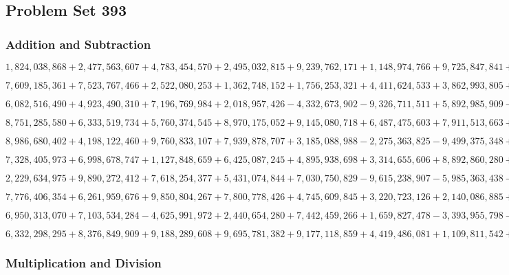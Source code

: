 \hypertarget{problem-set-393}{%
\subsection{Problem Set 393}\label{problem-set-393}}

\hypertarget{addition-and-subtraction}{%
\subsubsection{Addition and
Subtraction}\label{addition-and-subtraction}}

\(1,824,038,868+2,477,563,607+4,783,454,570+2,495,032,815+9,239,762,171+1,148,974,766+9,725,847,841+7,853,952,650+6,992,059,008+8,884,891,702\)

\(7,609,185,361+7,523,767,466+2,522,080,253+1,362,748,152+1,756,253,321+4,411,624,533+3,862,993,805+5,474,061,693+1,613,307,367+2,268,274,945\)

\(6,082,516,490+4,923,490,310+7,196,769,984+2,018,957,426-4,332,673,902-9,326,711,511+5,892,985,909-1,389,640,665-6,403,567,112+4,152,262,346\)

\(8,751,285,580+6,333,519,734+5,760,374,545+8,970,175,052+9,145,080,718+6,487,475,603+7,911,513,663+5,209,350,558+9,546,205,818+3,537,917,117\)

\(8,986,680,402+4,198,122,460+9,760,833,107+7,939,878,707+3,185,088,988-2,275,363,825-9,499,375,348+4,090,307,284-2,771,958,704-2,247,428,825\)

\(7,328,405,973+6,998,678,747+1,127,848,659+6,425,087,245+4,895,938,698+3,314,655,606+8,892,860,280+2,183,846,619+1,078,702,469+7,596,340,287\)

\(2,229,634,975+9,890,272,412+7,618,254,377+5,431,074,844+7,030,750,829-9,615,238,907-5,985,363,438-8,245,461,339+5,972,166,717-2,576,525,684\)

\(7,776,406,354+6,261,959,676+9,850,804,267+7,800,778,426+4,745,609,845+3,220,723,126+2,140,086,885+2,694,816,453+9,677,147,243+3,454,510,975\)

\(6,950,313,070+7,103,534,284-4,625,991,972+2,440,654,280+7,442,459,266+1,659,827,478-3,393,955,798-7,127,500,855-6,126,108,662+5,548,220,060\)

\(6,332,298,295+8,376,849,909+9,188,289,608+9,695,781,382+9,177,118,859+4,419,486,081+1,109,811,542+4,891,417,211+9,063,438,976+7,748,115,232\)

\hypertarget{multiplication-and-division}{%
\subsubsection{Multiplication and
Division}\label{multiplication-and-division}}

